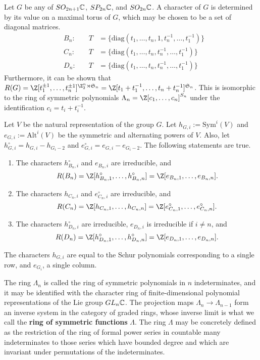 Let $G$ be any of $SO_{2n+1}\mathbb{C}$, $SP_{2n}\mathbb{C}$, and $SO_{2n}\mathbb{C}$. A character of $G$ is determined by its value on a maximal torus of $G$, which may be chosen to be a set of diagonal matrices. 
\begin{align*}
&B_n: &\quad T &= \{ \textrm{diag}(t_1, \dots, t_n, 1, t_n^{-1}, \dots, t_1^{-1}) \} \\ 
&C_n: &\quad T &= \{ \textrm{diag}(t_1, \dots, t_n, t_n^{-1}, \dots, t_1^{-1}) \} \\ 
&D_n: &\quad T &= \{ \textrm{diag}(t_1, \dots, t_n, t_n^{-1}, \dots, t_1^{-1}) \}
\end{align*}
Furthermore, it can be shown that $R(G) = \Z[t_1^{\pm 1}, \dots, t_n^{\pm 1}]^{\Z_2^n \rtimes \mathfrak{S}_n} = \Z[t_1+t_1^{-1}, \dots, t_n+t_n^{-1}]^{\mathfrak{S}_n}$. This is isomorphic to the ring of symmetric polynomials $\Lambda_n = \Z[c_1, \dots, c_n]^{S_n}$ under the identification $c_i = t_i + t_i^{-1}$. 

Let $V$ be the natural representation of the group $G$. Let $h_{G,i} := \textrm{Sym}^i(V)$ and $e_{G,i} := \textrm{Alt}^i(V)$ be the symmetric and alternating powers of $V$. Also, let $h_{G,i}^\circ = h_{G,i} - h_{G_i-2}$ and $e_{G,i}^\circ = e_{G,i} - e_{G_i-2}$. The following statements are true.
\begin{enumerate}
\item The characters $h_{B_n,i}^\circ$ and $e_{B_n,i}$ are irreducible, and \[R(B_n) = \Z[h_{B_n,1}^\circ, \dots, h_{B_n,n}^\circ] = \Z[e_{B_n,1}, \dots, e_{B_n,n}]. \]
\item The characters $h_{C_n,i}$ and $e_{C_n,i}^\circ$ are irreducible, and  \[R(C_n) = \Z[h_{C_n,1}, \dots, h_{C_n,n}] = \Z[e_{C_n,1}^\circ, \dots, e_{C_n,n}^\circ]. \]
\item The characters $h_{D_n,i}^\circ$ are irreducible, $e_{D_n,i}$ is irreducible if $i \neq n$, and \[R(D_n) = \Z[h_{D_n,1}^\circ, \dots, h_{D_n,n}^\circ] = \Z[e_{D_n,1}, \dots, e_{D_n,n}]. \]
\end{enumerate}
The characters $h_{G,i}$ are equal to the Schur polynomials corresponding to a single row, and $e_{G_i}$, a single column.

The ring $\Lambda_n$ is called the ring of symmetric polynomials in $n$ indeterminates, and it may be identified with the character ring of finite-dimensional polynomial representations of the Lie group $GL_n\mathbb{C}$. The projection maps $\Lambda_n \to \Lambda_{n-1}$ form an inverse system in the category of graded rings, whose inverse limit is what we call the \textbf{ring of symmetric functions} $\Lambda$. The ring $\Lambda$ may be concretely defined as the restriction of the ring of formal power series in countable many indeterminates to those series which have bounded degree and which are invariant under permutations of the indeterminates. 

